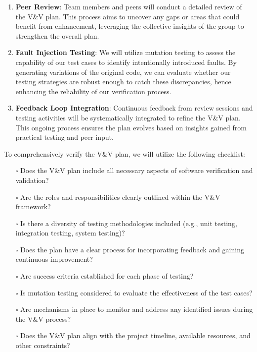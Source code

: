 \documentclass[12pt, titlepage]{article}
\begin{document}
\begin{enumerate}
    \item \textbf{Peer Review}: Team members and peers will conduct a detailed review of the V\&V plan. This process aims to uncover any gaps or areas that could benefit from enhancement, leveraging the collective insights of the group to strengthen the overall plan.
    
    \item \textbf{Fault Injection Testing}: We will utilize mutation testing to assess the capability of our test cases to identify intentionally introduced faults. By generating variations of the original code, we can evaluate whether our testing strategies are robust enough to catch these discrepancies, hence enhancing the reliability of our verification process.
    
    \item \textbf{Feedback Loop Integration}: Continuous feedback from review sessions and testing activities will be systematically integrated to refine the V\&V plan. This ongoing process ensures the plan evolves based on insights gained from practical testing and peer input.
\end{enumerate}


\noindent To comprehensively verify the V\&V plan, we will utilize the following checklist:

\begin{itemize}
    \item[$\square$] Does the V\&V plan include all necessary aspects of software verification and validation?
    \item[$\square$] Are the roles and responsibilities clearly outlined within the V\&V framework?
    \item[$\square$] Is there a diversity of testing methodologies included (e.g., unit testing, integration testing, system testing)?
    \item[$\square$] Does the plan have a clear process for incorporating feedback and gaining continuous improvement?
    \item[$\square$] Are success criteria established for each phase of testing?
    \item[$\square$] Is mutation testing considered to evaluate the effectiveness of the test cases?
    \item[$\square$] Are mechanisms in place to monitor and address any identified issues during the V\&V process?
    \item[$\square$] Does the V\&V plan align with the project timeline, available resources, and other constraints?
\end{itemize}
\end{document}
